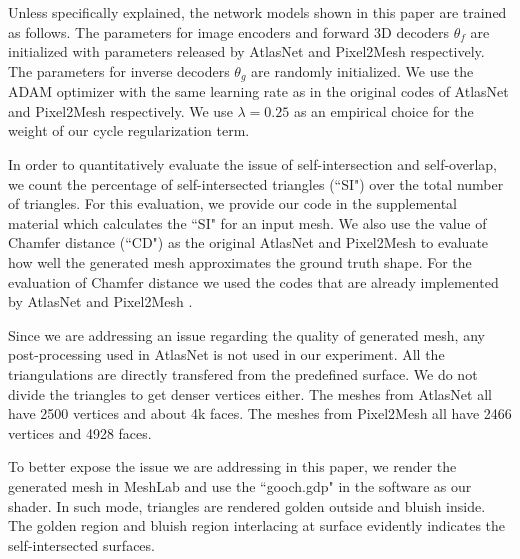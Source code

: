 Unless specifically explained, the network models shown in this paper are trained as follows. The parameters for image encoders and forward 3D decoders $\theta_f$ are initialized with parameters released by AtlasNet \cite{atlasnet} and Pixel2Mesh \cite{pixel2mesh} respectively. The parameters for inverse decoders $\theta_g$ are randomly initialized. We use the ADAM \cite{adam} optimizer with the same learning rate as in the original codes of AtlasNet and Pixel2Mesh respectively. We use $\lambda=0.25$ as an empirical choice for the weight of our cycle regularization term.

In order to quantitatively evaluate the issue of self-intersection and self-overlap, we count the percentage of self-intersected triangles (``SI") over the total number of triangles. For this evaluation, we provide our code in the supplemental material which calculates the ``SI" for an input mesh.  
We also use the value of Chamfer distance (``CD") as the original AtlasNet and Pixel2Mesh to evaluate how well the generated mesh approximates the ground truth shape. For the evaluation of Chamfer distance we used the codes that are already implemented by AtlasNet \cite{atlasnet} and Pixel2Mesh \cite{pixel2mesh}.

 Since we are addressing an issue regarding the quality of generated mesh, any post-processing used in AtlasNet \cite{atlasnet} is not used in our experiment. All the triangulations are directly transfered from the predefined surface. We do not divide the triangles to get denser vertices either. The meshes from AtlasNet all have 2500 vertices and about 4k faces. The meshes from Pixel2Mesh all have 2466 vertices and 4928 faces.

To better expose the issue we are addressing in this paper, we render the generated mesh in MeshLab and use the ``gooch.gdp" in the software as our shader. In such mode, triangles are rendered golden outside and bluish inside. The golden region and bluish region interlacing at surface evidently indicates the self-intersected surfaces.

